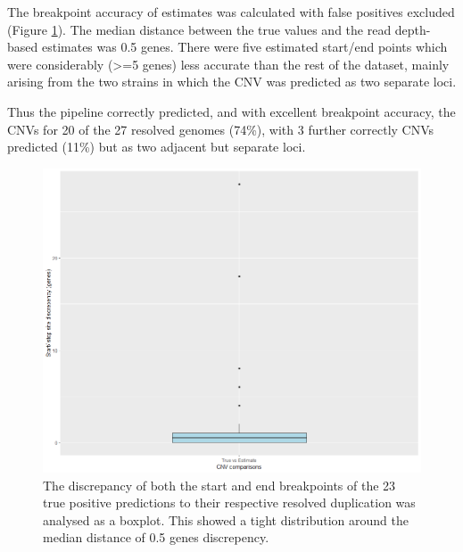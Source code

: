 \documentclass{article}
\begin{document}
The breakpoint accuracy of estimates was calculated with false positives excluded (Figure \ref{fig:CDC_breakpoint}). The median distance between the true values and the read depth-based estimates was 0.5 genes. There were five estimated start/end points which were considerably (>=5 genes) less accurate than the rest of the dataset, mainly arising from the two strains in which the CNV was predicted as two separate loci.

Thus the pipeline correctly predicted, and with excellent breakpoint accuracy, the CNVs for 20 of the 27 resolved genomes (74\%), with 3 further correctly CNVs predicted (11\%) but as two adjacent but separate loci.

\begin{figure}[h!]
\centering
\includegraphics[width=\textwidth{}]{Chapter_1/cdc_supp_b.png}
\caption{The discrepancy of both the start and end breakpoints of the 23 true positive predictions to their respective resolved duplication was analysed as a boxplot. This showed a tight distribution around the median distance  of 0.5 genes discrepency.}
\label{fig:CDC_breakpoint}
\end{figure}
\end{document}
